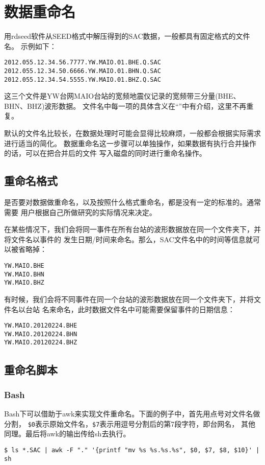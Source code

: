\section{数据重命名}
用rdseed软件从SEED格式中解压得到的SAC数据，一般都具有固定格式的文件名。
示例如下：
\begin{verbatim}
2012.055.12.34.56.7777.YW.MAIO.01.BHE.Q.SAC
2012.055.12.34.50.6666.YW.MAIO.01.BHN.Q.SAC
2012.055.12.34.54.5555.YW.MAIO.01.BHZ.Q.SAC
\end{verbatim}
这三个文件是YW台网MAIO台站的宽频地震仪记录的宽频带三分量(BHE、BHN、BHZ)波形数据。
文件名中每一项的具体含义在``''中有介绍，这里不再重复。

默认的文件名比较长，在数据处理时可能会显得比较麻烦，一般都会根据实际需求进行适当的简化。
数据重命名这一步骤可以单独操作，如果数据有执行合并操作的话，可以在把合并后的文件
写入磁盘的同时进行重命名操作。

\subsection{重命名格式}
是否要对数据做重命名，以及按照什么格式重命名，都是没有一定的标准的。通常需要
用户根据自己所做研究的实际情况来决定。

在某些情况下，我们会将同一事件在所有台站的波形数据放在同一个文件夹下，并将文件名以事件的
发生日期/时间来命名。那么，SAC文件名中的时间等信息就可以被省略掉：
\begin{verbatim}
YW.MAIO.BHE
YW.MAIO.BHN
YW.MAIO.BHZ
\end{verbatim}

有时候，我们会将不同事件在同一个台站的波形数据放在同一个文件夹下，并将文件名以台站
名来命名，此时数据文件名中可能需要保留事件的日期信息：
\begin{verbatim}
YW.MAIO.20120224.BHE
YW.MAIO.20120224.BHN
YW.MAIO.20120224.BHZ
\end{verbatim}

\subsection{重命名脚本}
\subsubsection*{Bash}
Bash下可以借助于awk来实现文件重命名。下面的例子中，首先用点号对文件名做分割，
\verb+$0+表示原始文件名，\verb+$7+表示用逗号分割后的第7段字符，即台网名，
其他同理。最后将awk的输出传给sh去执行。
\begin{verbatim}
$ ls *.SAC | awk -F "." '{printf "mv %s %s.%s.%s", $0, $7, $8, $10}' | sh
\end{verbatim}

